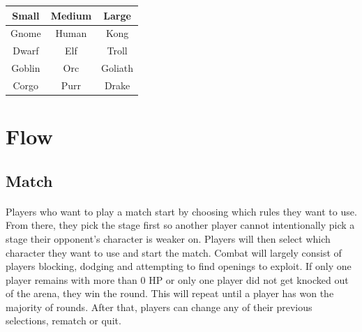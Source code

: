 \begin{table}[h!]
    \centering
    \begin{tabular}{|c|c|c|}
    \hline
    \textbf{Small}  & \textbf{Medium} & \textbf{Large}   \\
    \hline
    Gnome  & Human  & Kong    \\
    \hline
    Dwarf  & Elf    & Troll   \\
    \hline
    Goblin & Orc    & Goliath \\
    \hline
    Corgo  & Purr   & Drake  \\
    \hline
    \end{tabular}
\end{table}

\section{Flow}

\subsection{Match}

\paragraph{} Players who want to play a match start by choosing which rules they want to use. From there, they pick the stage first so another player cannot intentionally pick a stage their opponent's character is weaker on. Players will then select which character they want to use and start the match. Combat will largely consist of players blocking, dodging and attempting to find openings to exploit. If only one player remains with more than 0 HP or only one player did not get knocked out of the arena, they win the round. This will repeat until a player has won the majority of rounds. After that, players can change any of their previous selections, rematch or quit.

